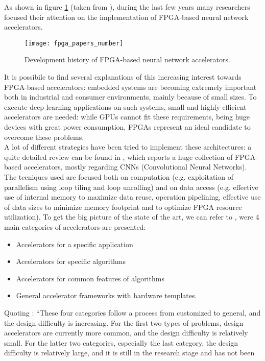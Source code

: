 \documentclass[11pt,a4paper]{article}
\begin{document}
As shown in figure \ref{fig:fpga_papers_number} (taken from \cite{wang_survey_2018}), during the last few years many researchers focused their attention on the implementation of FPGA-based neural network accelerators.
\begin{figure}[h]
    \centering	
    \texttt{[image: fpga\_papers\_number]}
    \caption{Development history of FPGA-based neural network accelerators.}
    \label{fig:fpga_papers_number}
\end{figure}
It is possibile to find several explanations of this increasing interest towards FPGA-based accelerators: embedded systems are becoming extremely important both in industrial and consumer environments, mainly because of small sizes. To execute deep learning applications on such systems, small and highly efficient accelerators are needed: while GPUs cannot fit these requirements, being huge devices with great power consumption, FPGAs represent an ideal candidate to overcome these problems.
\\A lot of different strategies have been tried to implement these architectures: a quite detailed review can be found in \cite{shawahna_review_2019}, which reports a huge collection of FPGA-based accelerators, mostly regarding CNNs (Convolutional Neural Networks). The tecniques used are focused both on computation (e.g. exploitation of parallelism using loop tiling and loop unrolling) and on data access (e.g. effective use of internal memory to maximize data reuse, operation pipelining, effective use of data sizes to minimize memory footprint and to optimize FPGA resource utilization). To get the big picture of the state of the art, we can refer to \cite{wang_survey_2018}, were 4 main categories of accelerators are presented:
\begin{itemize}
    \item Accelerators for a specific application
    \item Accelerators for specific algorithms
    \item Accelerators for common features of algorithms
    \item General accelerator frameworks with hardware templates.
\end{itemize}
Quoting \cite{wang_survey_2018}: ``These four categories follow a process from customized to general, and the design difficulty is increasing. For the first two types of problems, design accelerators are currently more common, and the design difficulty is relatively small. For the latter two categories, especially the last category, the design difficulty is relatively large, and it is still in the research stage and has not been
\end{document}

